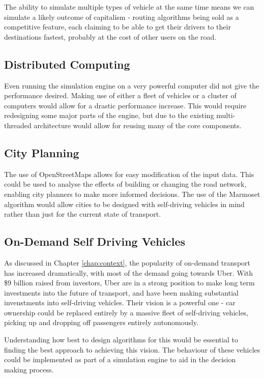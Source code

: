 \documentclass[ %
                    author={Alexander Hill},
                supervisor={Dr. Benjamin Sach},
                    degree={MEng},
                     title={MARMOSET},
                  subtitle={Multi-Agent Route Management using Online Simulation for Efficient Transportation},
                      type={research},
                      year={2016} ]{dissertation}
\begin{document}
The ability to simulate multiple types of vehicle at the same time means we can
simulate a likely outcome of capitalism - routing algorithms being sold as a
competitive feature, each claiming to be able to get their drivers to their
destinations fastest, probably at the cost of other users on the road.

\subsection*{Distributed Computing}

Even running the simulation engine on a very powerful computer did not give the
performance desired. Making use of either a fleet of vehicles or a cluster of
computers would allow for a drastic performance increase. This would require
redesigning some major parts of the engine, but due to the existing
multi-threaded architecture would allow for reusing many of the core components.

\subsection*{City Planning}

The use of OpenStreetMaps allows for easy modification of the input data.
This could be used to analyse the effects of building or changing the road
network, enabling city planners to make more informed decisions. The use of the
Marmoset algorithm would allow cities to be designed with self-driving vehicles
in mind rather than just for the current state of transport.

\subsection*{On-Demand Self Driving Vehicles}

As discussed in Chapter \ref{chap:context}, the popularity of on-demand
transport has increased dramatically, with most of the demand going towards
Uber. With \$9 billion raised from investors, Uber are in a strong position to
make long term investments into the future of transport, and have been making
substantial invenstments into self-driving vehicles. Their vision is a powerful
one - car ownership could be replaced entirely by a massive fleet of
self-driving vehicles, picking up and dropping off passengers entirely
autonomously.

Understanding how best to design algorithms for this would be essential to
finding the best approach to achieving this vision. The behaviour of these
vehicles could be implemented as part of a simulation engine to aid in the
decision making process.
\end{document}
